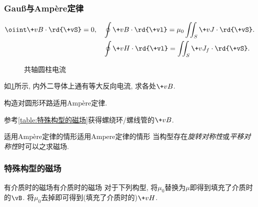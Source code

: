 \documentclass[hidelinks]{ctexart}
\begin{document}

\subsubsection{\texorpdfstring{Gau\ss 与Amp\`ere定律}{Gauss定律与Ampere定律}} %
\label{ssub:gauss与amp1ere定律}

\begin{finale}
    \vspace*{-\baselineskip}
    \begin{align*}
        \oiint \+vB\cdot\rd{\+vS} = 0,\quad & \oint \+vB\cdot\rd{\+vl} = \mu_0 \iint_S \+vJ\cdot\rd{\+vS}.\\
        & \oint \+vH\cdot\rd{\+vl} = \iint_S \+vJ_f\cdot\rd{\+vS}.
    \end{align*}
\end{finale}

\begin{figure}[ht]
    \centering
    \caption{共轴圆柱电流}
    \label{fig:共轴圆柱电流}
\end{figure}

\begin{sample}
    \begin{ex}
        如\cref{fig:共轴圆柱电流}所示, 内外二导体上通有等大反向电流, 求各处$\+vB$.
    \end{ex}
    \begin{solution}
        构造对圆形环路适用Amp\`ere定律.
    \end{solution}
\end{sample}
\begin{hardlink}
    参考\cref{table:特殊构型的磁场}获得螺绕环/螺线管的$\+vB$.
\end{hardlink}

\begin{reflex}
    {适用Amp\`ere定律的情形}{适用Ampere定律的情形}
    当构型存在\emph{旋转对称性}或\emph{平移对称性}时可以之求磁场.
\end{reflex}


\subsubsection{特殊构型的磁场} %
\label{ssub:特殊构型的磁场}

\begin{reflex}
    {有介质时的磁场}{有介质时的磁场}
    对于下列构型, 将$\mu_0$替换为$\mu$即得到填充了介质时的$\vB$. 将$\mu_0$去掉即可得到(填充了介质时的)$\+vH$.
\end{reflex}
\end{document}
